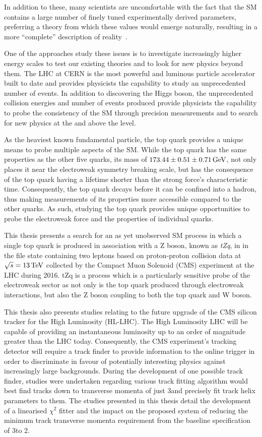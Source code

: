 In addition to these, many scientists are uncomfortable with the fact that the SM contains a large number of finely tuned experimentally derived parameters, preferring a theory from which these values would emerge naturally, resulting in a more ``complete'' description of reality~\cite{Burdman:2007ck}.

One of the approaches study these issues is to investigate increasingly higher energy scales to test our existing theories and to look for new physics beyond them.
The LHC at CERN is the most powerful and luminous particle accelerator built to date and provides physicists the capability to study an unprecedented number of events.
In addition to discovering the Higgs boson, the unprecedented collision energies and number of events produced provide physicists the capability to probe the consistency of the SM through precision measurements and to search for new physics at the and above the \TeV level.

As the heaviest known fundamental particle, the top quark provides a unique means to probe multiple aspects of the SM.
While the top quark has the same properties as the other five quarks, its mass of $173.44 \pm 0.51 \pm 0.71 \,\text{Ge\hspace{-.08em}V}$, not only places it near the electroweak symmetry breaking scale, but has the consequence of the top quark having a lifetime shorter than the strong force’s characteristic time.
Consequently, the top quark decays before it can be confined into a hadron, thus making measurements of its properties more accessible compared to the other quarks.
As such, studying the top quark provides unique opportunities to probe the electroweak force and the properties of individual quarks.

This thesis presents a search for an as yet unobserved SM process in which a single top quark is produced  in association with a Z boson, known as \emph{tZq}, in in the file state containing two leptons based on proton-proton collision data at $\sqrt{s} = 13\,\text{Te\hspace{-.08em}V}$ collected by the Compact Muon Solenoid (CMS) experiment at the LHC during 2016.
tZq is a process which is a particularly sensitive probe of the electroweak sector as not only is the top quark produced through electroweak interactions, but also the Z boson coupling to both the top quark and W boson.

This thesis also presents studies relating to the future upgrade of the CMS silicon tracker for the High Luminosity (HL-LHC).
The High Luminosity LHC will be capable of providing an instantaneous luminosity up to an order of magnitude greater than the LHC today.
Consequently, the CMS experiment's tracking detector will require a track finder to provide information to the online trigger in order to discriminate in favour of potentially interesting physics against increasingly large backgrounds.
During the development of one possible track finder, studies were undertaken regarding various track fitting algorithm would best find tracks down to transverse momenta of just 3\GeV and precisely fit track helix parameters to them.
The studies presented in this thesis detail the development of a linearised $\chi^{2}$ fitter and the impact on the proposed system of reducing the minimum track transverse momenta requirement from the baseline specification of 3\GeV to 2\GeV.
